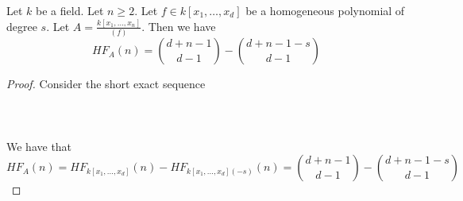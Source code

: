 \documentclass[a4paper]{article}
\begin{document}
\begin{eg}{}{} Let $k$ be a field. Let $n\geq 2$. Let $f\in k[x_1,\dots,x_d]$ be a homogeneous polynomial of degree $s$. Let $A=\frac{k[x_1,\dots,x_n]}{(f)}$. Then we have $$HF_A(n)=\binom{d+n-1}{d-1}-\binom{d+n-1-s}{d-1}$$ \tcbline
\begin{proof}
Consider the short exact sequence \\~\\
\\~\\
We have that $$HF_A(n)=HF_{k[x_1,\dots,x_d]}(n)-HF_{k[x_1,\dots,x_d](-s)}(n)=\binom{d+n-1}{d-1}-\binom{d+n-1-s}{d-1}$$
\end{proof}
\end{eg}
\end{document}
